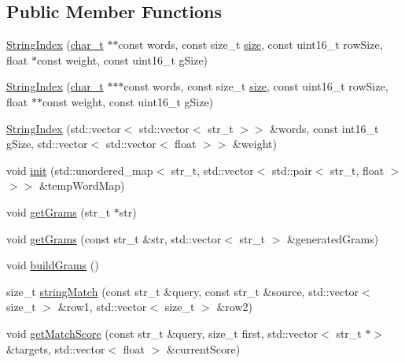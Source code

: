 \subsection*{Public Member Functions}
\begin{DoxyCompactItemize}
\item 
\mbox{\hyperlink{class_string_index_aec0c7112ef81d953265033f9a779730f}{String\+Index}} (\mbox{\hyperlink{class_string_index_a47f131c73d15a7c10c10a9748adf45dc}{char\+\_\+t}} $\ast$$\ast$const words, const size\+\_\+t \mbox{\hyperlink{class_string_index_a95acf789f43ead39b067d1c82d3a9b02}{size}}, const uint16\+\_\+t row\+Size, float $\ast$const weight, const uint16\+\_\+t g\+Size)
\item 
\mbox{\hyperlink{class_string_index_a2e323737994e475a5e5b6ccc9f631fff}{String\+Index}} (\mbox{\hyperlink{class_string_index_a47f131c73d15a7c10c10a9748adf45dc}{char\+\_\+t}} $\ast$$\ast$$\ast$const words, const size\+\_\+t \mbox{\hyperlink{class_string_index_a95acf789f43ead39b067d1c82d3a9b02}{size}}, const uint16\+\_\+t row\+Size, float $\ast$$\ast$const weight, const uint16\+\_\+t g\+Size)
\item 
\mbox{\hyperlink{class_string_index_ab7114eb0acf9e736de851487398a4cef}{String\+Index}} (std\+::vector$<$ std\+::vector$<$ str\+\_\+t $>$$>$ \&words, const int16\+\_\+t g\+Size, std\+::vector$<$ std\+::vector$<$ float $>$$>$ \&weight)
\item 
void \mbox{\hyperlink{class_string_index_a56c849706990da23bb621522da959fa9}{init}} (std\+::unordered\+\_\+map$<$ str\+\_\+t, std\+::vector$<$ std\+::pair$<$ str\+\_\+t, float $>$$>$$>$ \&temp\+Word\+Map)
\item 
void \mbox{\hyperlink{class_string_index_a924cd52b4e055853db22f89e73f71fce}{get\+Grams}} (str\+\_\+t $\ast$str)
\item 
void \mbox{\hyperlink{class_string_index_a1b66797dae7f0f1d4f3cf830dfeee869}{get\+Grams}} (const str\+\_\+t \&str, std\+::vector$<$ str\+\_\+t $>$ \&generated\+Grams)
\item 
void \mbox{\hyperlink{class_string_index_a7e326eb6fe367a6758c21aefbf64fe51}{build\+Grams}} ()
\item 
size\+\_\+t \mbox{\hyperlink{class_string_index_a97835599308c1e5feb47323545584dfd}{string\+Match}} (const str\+\_\+t \&query, const str\+\_\+t \&source, std\+::vector$<$ size\+\_\+t $>$ \&row1, std\+::vector$<$ size\+\_\+t $>$ \&row2)
\item 
void \mbox{\hyperlink{class_string_index_a32f2294a19ad5360bd62f1ede07c6c5e}{get\+Match\+Score}} (const str\+\_\+t \&query, size\+\_\+t first, std\+::vector$<$ str\+\_\+t $\ast$$>$ \&targets, std\+::vector$<$ float $>$ \&current\+Score)
$$
\end{DoxyCompactItemize}
